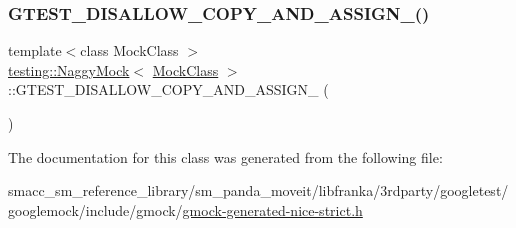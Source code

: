 \subsubsection{\texorpdfstring{G\+T\+E\+S\+T\+\_\+\+D\+I\+S\+A\+L\+L\+O\+W\+\_\+\+C\+O\+P\+Y\+\_\+\+A\+N\+D\+\_\+\+A\+S\+S\+I\+G\+N\+\_\+()}{GTEST\_DISALLOW\_COPY\_AND\_ASSIGN\_()}}
{\footnotesize\ttfamily template$<$class Mock\+Class $>$ \\
\hyperlink{classtesting_1_1NaggyMock}{testing\+::\+Naggy\+Mock}$<$ \hyperlink{classMockClass}{Mock\+Class} $>$\+::G\+T\+E\+S\+T\+\_\+\+D\+I\+S\+A\+L\+L\+O\+W\+\_\+\+C\+O\+P\+Y\+\_\+\+A\+N\+D\+\_\+\+A\+S\+S\+I\+G\+N\+\_\+ (\begin{DoxyParamCaption}\item[{\hyperlink{classtesting_1_1NaggyMock}{Naggy\+Mock}$<$ \hyperlink{classMockClass}{Mock\+Class} $>$}]{ }\end{DoxyParamCaption})\hspace{0.3cm}{\ttfamily [private]}}



The documentation for this class was generated from the following file\+:\begin{DoxyCompactItemize}
\item 
smacc\+\_\+sm\+\_\+reference\+\_\+library/sm\+\_\+panda\+\_\+moveit/libfranka/3rdparty/googletest/googlemock/include/gmock/\hyperlink{gmock-generated-nice-strict_8h}{gmock-\/generated-\/nice-\/strict.\+h}\end{DoxyCompactItemize}
